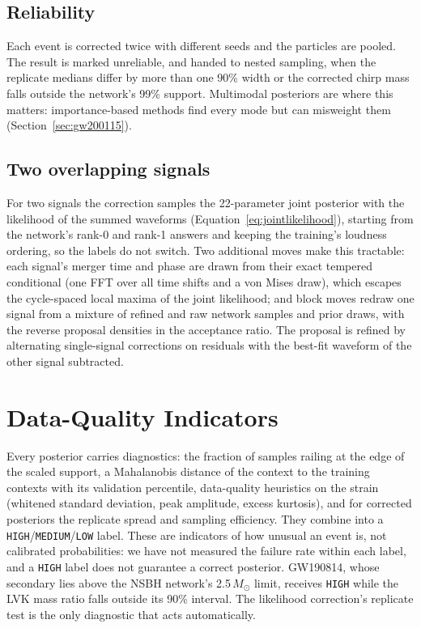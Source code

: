 \documentclass[twocolumn,linenumbers]{aastex701}
\newcommand{\msun}{M_{\odot}}
\begin{document}
\subsection{Reliability} \label{sec:reliability}

Each event is corrected twice with different seeds and the particles are
pooled. The result is marked unreliable, and handed to nested sampling, when
the replicate medians differ by more than one 90\% width or the corrected
chirp mass falls outside the network's 99\% support. Multimodal posteriors are
where this matters: importance-based methods find every mode but can misweight
them (Section~\ref{sec:gw200115}).

\subsection{Two overlapping signals} \label{sec:joint}

For two signals the correction samples the 22-parameter joint posterior with
the likelihood of the summed waveforms (Equation~\ref{eq:jointlikelihood}),
starting from the network's rank-0 and rank-1 answers and keeping the
training's loudness ordering, so the labels do not switch. Two additional
moves make this tractable: each signal's merger time and phase are drawn from
their exact tempered conditional (one FFT over all time shifts and a von Mises
draw), which escapes the cycle-spaced local maxima of the joint likelihood;
and block moves redraw one signal from a mixture of refined and raw network
samples and prior draws, with the reverse proposal densities in the
acceptance ratio. The proposal is refined
by alternating single-signal corrections on residuals with the best-fit
waveform of the other signal subtracted.

\section{Data-Quality Indicators} \label{sec:ood}

Every posterior carries diagnostics: the fraction of samples railing at the
edge of the scaled support, a Mahalanobis distance of the context to the
training contexts with its validation percentile, data-quality heuristics on
the strain (whitened standard deviation, peak amplitude, excess kurtosis), and
for corrected posteriors the replicate spread and sampling efficiency. They
combine into a \texttt{HIGH}/\texttt{MEDIUM}/\texttt{LOW} label. These are indicators of
how unusual an event is, not calibrated probabilities: we have not measured the failure
rate within each label, and a \texttt{HIGH} label does not guarantee a correct posterior.
GW190814, whose secondary lies above the NSBH network's 2.5\,$\msun$ limit, receives
\texttt{HIGH} while the LVK mass ratio falls outside its 90\% interval. The
likelihood correction's replicate test is the only diagnostic that acts
automatically.
\end{document}
